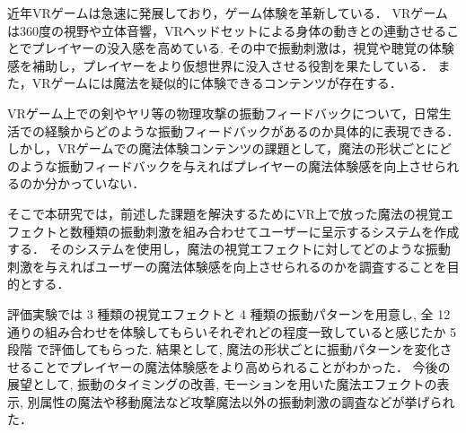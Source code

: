 近年VRゲームは急速に発展しており，ゲーム体験を革新している．
VRゲームは360度の視野や立体音響，VRヘッドセットによる身体の動きとの連動させることでプレイヤーの没入感を高めている.
その中で振動刺激は，視覚や聴覚の体験感を補助し，プレイヤーをより仮想世界に没入させる役割を果たしている．
また，VRゲームには魔法を疑似的に体験できるコンテンツが存在する．

VRゲーム上での剣やヤリ等の物理攻撃の振動フィードバックについて，日常生活での経験からどのような振動フィードバックがあるのか具体的に表現できる．
しかし，VRゲームでの魔法体験コンテンツの課題として，魔法の形状ごとにどのような振動フィードバックを与えればプレイヤーの魔法体験感を向上させられるのか分かっていない．

そこで本研究では，前述した課題を解決するためにVR上で放った魔法の視覚エフェクトと数種類の振動刺激を組み合わせてユーザーに呈示するシステムを作成する．
そのシステムを使用し，魔法の視覚エフェクトに対してどのような振動刺激を与えればユーザーの魔法体験感を向上させられるのかを調査することを目的とする．

評価実験では 3 種類の視覚エフェクトと 4 種類の振動パターンを用意し, 全 12 通りの組み合わせを体験してもらいそれぞれどの程度一致していると感じたか 5 段階
で評価してもらった. 
結果として, 魔法の形状ごとに振動パターンを変化させることでプレイヤーの魔法体験感をより高められることがわかった．
今後の展望として, 振動のタイミングの改善, モーションを用いた魔法エフェクトの表示, 別属性の魔法や移動魔法など攻撃魔法以外の振動刺激の調査などが挙げられた．
